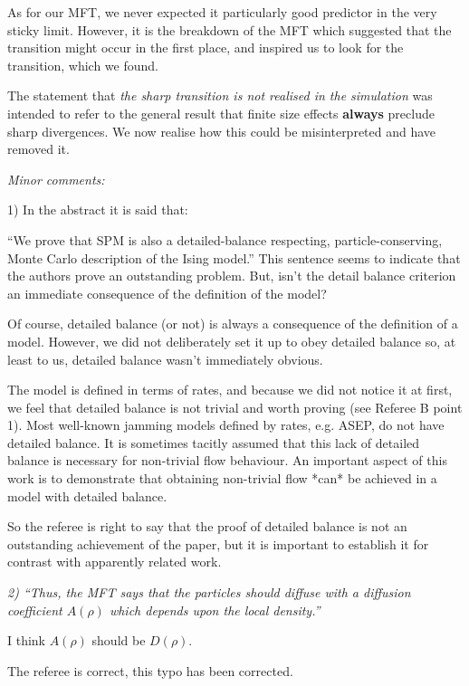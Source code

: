 \documentclass[a4paper,10pt]{article}
\begin{document}
  As for our MFT, we never expected it particularly good predictor in the very sticky limit. However, it is the breakdown of the MFT which suggested that the transition might occur in the first place,
  and inspired us to look for the transition, which we found.
 

The statement that {\it the sharp transition is not realised in the
  simulation} was intended to refer to the general result that finite size effects {\bf
  always} preclude sharp divergences.  We now realise how this could
be misinterpreted and have removed it.
 
  
{\it    Minor comments:
  
   1) In the abstract it is said that:
  
   ``We prove that SPM is also a detailed-balance respecting,
   particle-conserving, Monte Carlo description of the Ising model.''
   This sentence seems to indicate that the authors prove an outstanding problem. But, isn't the detail balance criterion an immediate consequence of the definition of the model? }
 
   Of course, detailed balance (or not) is always a consequence of the
   definition of a model.  However, we did not deliberately set it up
   to obey detailed balance so, at least to us, detailed balance
   wasn't immediately obvious. 
  
   The model is defined in terms of rates, and because we did not
   notice it at first, we feel that detailed balance is not trivial
   and worth proving (see Referee B point 1). Most well-known jamming
   models defined by rates, e.g. ASEP, do not have detailed balance.
   It is sometimes tacitly assumed that this lack of detailed balance is
   necessary for non-trivial flow behaviour.  An important aspect of
   this work is to demonstrate that obtaining non-trivial flow *can*
   be achieved in a model with detailed balance.
 
So the referee is right to say that the proof of detailed balance is
not an outstanding achievement of the paper, but it is important to
establish it for contrast with apparently related work.

{\it 
   2) ``Thus, the MFT says that the particles should diffuse with a diffusion coefficient $A(\rho)$ which depends upon the local density.''
  
  
   I think $A(\rho)$ should be $D(\rho)$.}

The referee is correct, this typo has been corrected.
\end{document}
